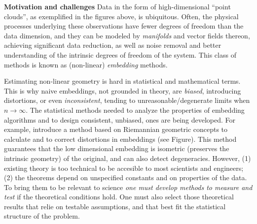 \documentclass[floatfix,11pt]{article}
\begin{document}
\textbf{Motivation and challenges} Data in the form of
high-dimensional ``point clouds'',  as exemplified in the figures above, is ubiquitous.
%
Often, the physical processes underlying these observations have
fewer degrees of freedom than the data dimension, and they can be
modeled by {\em manifolds} and vector fields thereon, achieving
significant data reduction, as well as noise removal and better understanding of the intrinsic degrees of freedom of the system. This class
of methods is known as (non-linear) {\em  embedding} methods.



Estimating non-linear geometry is hard in statistical and mathematical terms. This is why na{i}ve embeddings, not grounded in theory, are {\em biased}, introducing distortions, or even {\em inconsistent}, tending to unreasonable/degenerate limits when $n\rightarrow \infty$. The statistical methods needed to analyze the properties of embedding algorithms and to design consistent, unbiased, ones are being developed. For example, \cite{2013arXiv1305.7255P} introduce a method based on Riemannian geometric concepts to calculate and to correct distortions in embeddings (see Figure). This method guarantees that the low dimensional embedding is isometric (preserves the intrinsic geometry) of the original, and can also detect degeneracies. 
However, (1) existing theory is too technical to be accesible to most scientists and engineers; (2) the theorems depend on unspecified constants and on properties of the data. To bring them to be relevant to science {\em one must develop methods to measure and test} if the theoretical conditions hold. One must also select those theoretical results that relie on testable assumptions, and that best fit the statistical structure of the problem. 
\end{document}
